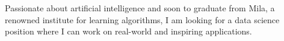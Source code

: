 


\begin{cvparagraph}




Passionate about artificial intelligence and soon to graduate from Mila, a renowned institute for learning algorithms, I am looking for a data science position where I can work on real-world and inspiring applications.


\end{cvparagraph}
